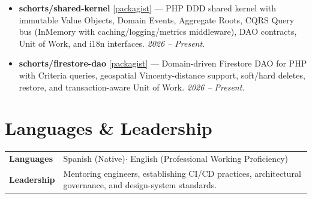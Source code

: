 \documentclass[10.5pt,a4paper]{article}
\begin{document}
\begin{itemize}
  \item \textbf{schorts/shared-kernel}
        \href{https://packagist.org/packages/schorts/shared-kernel}{\small\color{muted}[packagist]}
        --- PHP DDD shared kernel with immutable Value Objects, Domain Events, Aggregate
        Roots, CQRS Query bus (InMemory with caching/logging/metrics middleware), DAO
        contracts, Unit of Work, and i18n interfaces. \textit{2026 -- Present.}

  \item \textbf{schorts/firestore-dao}
        \href{https://packagist.org/packages/schorts/firestore-dao}{\small\color{muted}[packagist]}
        --- Domain-driven Firestore DAO for PHP with Criteria queries, geospatial
        Vincenty-distance support, soft/hard deletes, restore, and transaction-aware
        Unit of Work. \textit{2026 -- Present.}
\end{itemize}

\section{Languages \& Leadership}

\begin{tabularx}{\linewidth}{@{} l X @{}}
  \textbf{Languages}  & Spanish (Native)\enspace\textcolor{muted}{$\cdot$}\enspace
                        English (Professional Working Proficiency) \\[2pt]
  \textbf{Leadership} & Mentoring engineers, establishing CI/CD practices,
                        architectural governance, and design-system standards. \\
\end{tabularx}
\end{document}
